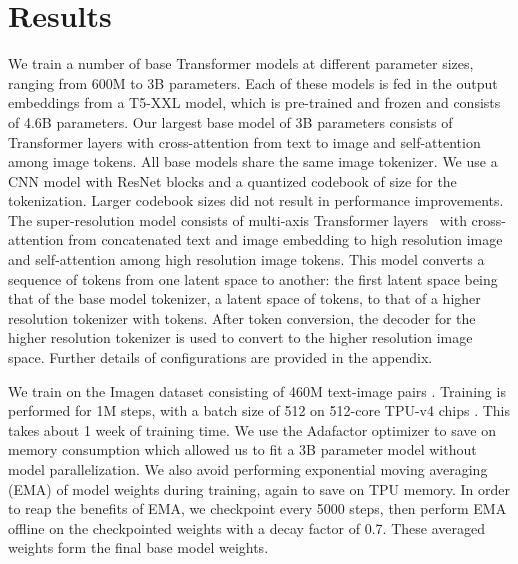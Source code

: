 \section{Results}
\label{sec:results}
We train a number of base Transformer models at different parameter sizes, ranging from 600M to 3B parameters. Each of these models is fed in the output embeddings from a T5-XXL model, which is pre-trained and frozen and consists of 4.6B parameters. Our largest base model of 3B parameters consists of  Transformer layers with cross-attention from text to image and self-attention among image tokens. All base models share the same image tokenizer. We use a CNN model with  ResNet blocks and a quantized codebook of size  for the tokenization. Larger codebook sizes did not result in performance improvements. The super-resolution model consists of  multi-axis Transformer layers~\cite{hit} with cross-attention from concatenated text and image embedding to high resolution image and self-attention among high resolution image tokens. This model converts a sequence of tokens from one latent space to another: the first latent space being that of the base model tokenizer, a latent space of  tokens, to that of a higher resolution tokenizer with  tokens. After token conversion, the decoder for the higher resolution tokenizer is used to convert to the higher resolution image space. Further details of configurations are provided in the appendix.

We train on the Imagen dataset consisting of 460M text-image pairs \citep{imagen}.
Training is performed for 1M steps, with a batch size of 512 on 512-core TPU-v4 chips \citep{jouppi2020domain}. This takes about 1 week of training time. We use the Adafactor optimizer \citep{shazeer2018adafactor} to save on memory consumption which allowed us to fit a 3B parameter model without model parallelization. We also avoid performing exponential moving averaging (EMA) of model weights during training, again to save on TPU memory. In order to reap the benefits of EMA, we checkpoint every 5000 steps, then perform EMA offline on the checkpointed weights with a decay factor of 0.7. These averaged weights form the final base model weights.


